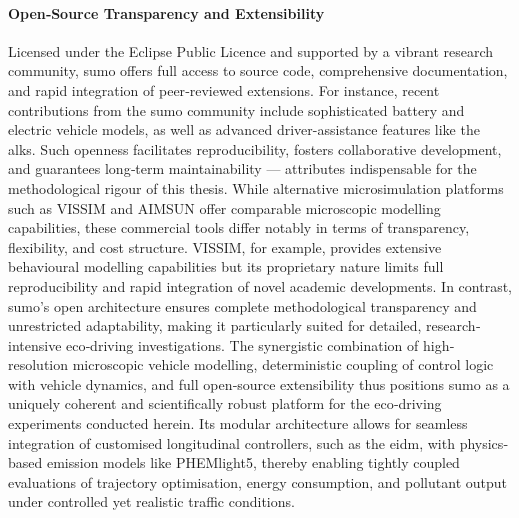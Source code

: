 \paragraph{Open‐Source Transparency and Extensibility}
Licensed under the Eclipse Public Licence and supported by a vibrant research community, \ac{sumo} offers full access to source code, comprehensive documentation, and rapid integration of peer‐reviewed extensions. For instance, recent contributions from the \ac{sumo} community include sophisticated battery and electric vehicle models, as well as advanced driver-assistance features like the \ac{alks}. Such openness facilitates reproducibility, fosters collaborative development, and guarantees long‐term maintainability --- attributes indispensable for the methodological rigour of this thesis.
\mynewline
While alternative microsimulation platforms such as VISSIM and AIMSUN offer comparable microscopic modelling capabilities, these commercial tools differ notably in terms of transparency, flexibility, and cost structure. VISSIM, for example, provides extensive behavioural modelling capabilities but its proprietary nature limits full reproducibility and rapid integration of novel academic developments. In contrast, \ac{sumo}'s open architecture ensures complete methodological transparency and unrestricted adaptability, making it particularly suited for detailed, research‐intensive eco‐driving investigations.
\mynewline
The synergistic combination of high‐resolution microscopic vehicle modelling, deterministic coupling of control logic with vehicle dynamics, and full open‐source extensibility thus positions \ac{sumo} as a uniquely coherent and scientifically robust platform for the eco‐driving experiments conducted herein. Its modular architecture allows for seamless integration of customised longitudinal controllers, such as the \ac{eidm}, with physics‐based emission models like PHEMlight5, thereby enabling tightly coupled evaluations of trajectory optimisation, energy consumption, and pollutant output under controlled yet realistic traffic conditions.
